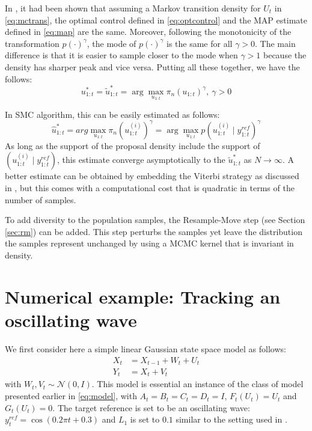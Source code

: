 In \cite{NK11}, it had been shown that assuming a Markov transition density for $U_t$ in \eqref{eq:mctrans}, the optimal control defined in \eqref{eq:optcontrol} and the MAP estimate defined in \eqref{eq:map} are the same. Moreover, following the monotonicity of the transformation $p(\cdot)^\gamma$, the mode of $p(\cdot)^\gamma$ is the same for all $\gamma > 0$. The main difference is that it is easier to sample closer to the mode when $\gamma > 1$ because the density has sharper peak and vice versa. Putting all these together, we have the follows:
\begin{equation}
  u^*_{1:t} = \tilde{u}^*_{1:t} = \arg\max_{u_{1:t}} \pi_n(u_{1:t})^\gamma,~\gamma > 0
\end{equation}

In SMC algorithm, this can be easily estimated as follows:
\begin{equation}
\hat{u}^*_{1:t} = arg\max_{u_{1:t}} \pi_n(u^{(i)}_{1:t})^\gamma = \arg\max_{u_{1:t}} p(u^{(i)}_{1:t} \mid y^{ref}_{1:t})^\gamma
\end{equation}
As long as the support of the proposal density include the support of $(u^{(i)}_{1:t} \mid y^{ref}_{1:t})$, this estimate converge asymptotically to the $\tilde{u}^*_{1:t}$ as $N \to \infty$. A better estimate can be obtained by embedding the Viterbi strategy as discussed in \cite{SG01}, but this comes with a computational cost that is quadratic in terms of the number of samples.

To add diversity to the population samples, the Resample-Move step (see Section \ref{sec:rm}) can be added. This step perturbs the samples yet leave the distribution the samples represent unchanged by using a MCMC kernel that is invariant in density.

\section{Numerical example: Tracking an oscillating wave}
\label{sec:exp1}
We first consider here a simple linear Gaussian state space model as follows:
\begin{align}
  X_t &= X_{t-1} + W_t + U_t \nonumber \\
  Y_t &= X_t + V_t
\label{eq:refnmodel}
\end{align}
with $W_t, V_t \sim \mathcal{N}(0,I)$. This model is essential an instance of the class of model presented earlier in \eqref{eq:model}, with $A_t=B_t=C_t=D_t=I$, $F_t(U_t)=U_t$ and $G_t(U_t)=0$. The target reference is set to be an oscillating wave: $y^{ref}_t = \cos(0.2 \pi t + 0.3)$ and $L_1$ is set to $0.1$ similar to the setting used in \cite{NK11}.

